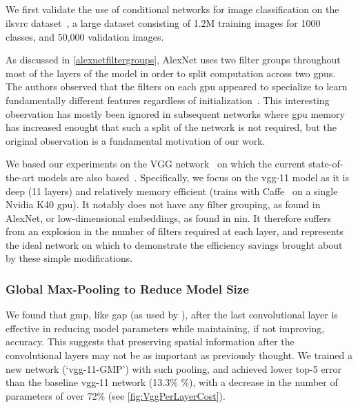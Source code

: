 \documentclass[thesis]{subfiles}
\begin{document}
	\subsection{}
	We first validate the use of conditional networks for image classification on the \gls{ilsvrc} dataset~\citep{ILSVRC2015}, a large dataset consisting of 1.2M training images for 1000 classes, and 50,000 validation images.
	
	As discussed in \cref{alexnetfiltergroups}, AlexNet uses two filter groups throughout most of the layers of the model in order to split computation across two \gls{gpu}s. The authors observed that the filters on each \gls{gpu} appeared to specialize to learn fundamentally different features regardless of initialization~\citep{Krizhevsky2012}. This interesting observation has mostly been ignored in subsequent networks where \gls{gpu} memory has increased enought that such a split of the network is not required, but the original observation is a fundamental motivation of our work.
	
	We based our experiments on the VGG network~\citep{Simonyan2014verydeep} on which the current state-of-the-art models are also based~\citep{He2015b}. Specifically, we focus on the \gls{vgg}-11 model as it is deep (11 layers) and relatively memory efficient (trains with Caffe~\citep{Jia2014} on a single Nvidia K40 \gls{gpu}). It notably does not have any filter grouping, as found in AlexNet, or low-dimensional embeddings, as found in \gls{nin}. It therefore suffers from an explosion in the number of filters required at each layer, and represents the ideal network on which to demonstrate the efficiency savings brought about by these simple modifications.
	
	\subsubsection{Global Max-Pooling to Reduce Model Size}
	We found that \gls{gmp}, like \gls{gap} (as used by \citet{Lin2013NiN,Szegedy2014going}), after the last convolutional layer is effective in reducing model parameters while maintaining, if not improving, accuracy. This suggests that preserving spatial information after the convolutional layers may not be as important as previously thought. 
	We trained a new network (`\gls{vgg}-11-GMP') with such pooling, and achieved lower top-5 error than the baseline \gls{vgg}-11 
	network (13.3\% \%), with a decrease in the number of parameters of over 72\% (see \cref{fig:VggPerLayerCost}).
	
\end{document}
